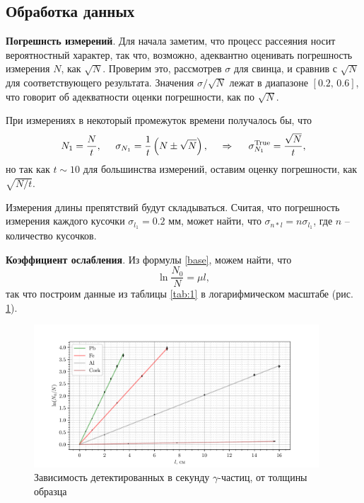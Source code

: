 \subsection*{Обработка данных}


\textbf{Погрешнсть измерений}. Для начала заметим, что процесс рассеяния носит вероятностный характер, так что, возможно, адеквантно оценивать погрешность измерения $N$, как $\sqrt{N}$. Проверим это, рассмотрев $\sigma$  для свинца, и сравнив с $\sqrt{N}$ для соответствующего результата. Значения $\sigma / \sqrt{N}$ лежат в диапазоне $[0.2,\, 0.6]$, что говорит об адекватности оценки погрешности, как по $\sqrt{N}$.

При измерениях в некоторый промежуток времени получалось бы, что 
\begin{equation}
    N_1 = \frac{N}{t}, \hspace{5 mm} 
    \sigma_{N_1} = \frac{1}{t}\left(N \pm \sqrt{N}\right),
    \hspace{0.5cm} \Rightarrow \hspace{0.5cm}
    \sigma^{\text{True}}_{N_1} = \frac{\sqrt{N}}{t},
    \label{err}
\end{equation}
но так как $t \sim 10$ для большинства измерений, оставим оценку погрешности, как $\sqrt{N/t}$.



Измерения длины препятствий будут складываться. Считая, что погрешность измерения каждого кусочки $\sigma_{l_1} = 0.2$ мм, может найти, что $\sigma_{n * l} = n \sigma_{l_1}$,
где $n$ -- количество кусочков. 



\textbf{Коэффициент ослабления}. Из формулы \eqref{base}, можем найти, что
\begin{equation*}
    \ln \frac{N_0}{N} = \mu l,
\end{equation*}
так что построим данные из таблицы \ref{tab:1} в логарифмическом масштабе (рис. \ref{fig:1}).

\vspace{-1cm}

\begin{figure}[h]
    \centering
    \includegraphics[width=0.95\textwidth]{figures/plot511.pdf}
    \caption{Зависимость детектированных в секунду $\gamma$-частиц, от толщины образца}
    \label{fig:1}
\end{figure}


